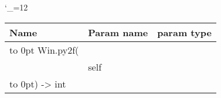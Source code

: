 \begingroup \catcode`\_=12 \tt
\begin{tabular}{lll}
\toprule
\textrm{Name}&\textrm{Param name}&\textrm{param type}\\
\midrule
\hbox to 0pt {Win.py2f(\hss}\\
& self\\
\hbox to 0pt{) -> int\hss}\\
\bottomrule
\end{tabular}
\endgroup
